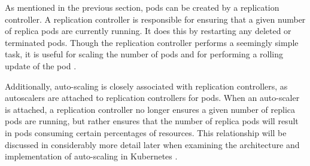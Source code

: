 As mentioned in the previous section, pods can be created by a replication
controller. A replication controller is responsible for ensuring that a given
number of replica pods are currently running. It does this by restarting any
deleted or terminated pods. Though the replication controller performs a
seemingly simple task, it is useful for scaling the number of pods and for
performing a rolling update of the pod \cite{k8s-replication-controllers}.

Additionally, auto-scaling is closely associated with replication controllers, as
autoscalers are attached to replication controllers for pods. When an
auto-scaler is attached, a replication controller no longer ensures a given
number of replica pods are running, but rather ensures that the number of
replica pods will result in pods consuming certain percentages of resources.
This relationship will be discussed in considerably more detail later when
examining the architecture and implementation of auto-scaling in Kubernetes
\cite{k8s-horizontal-pod-autoscaler-proposal}.
